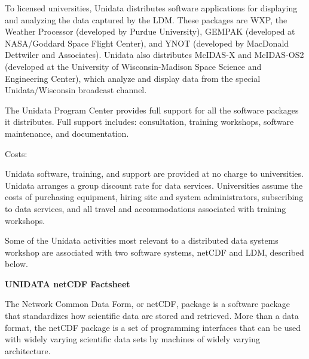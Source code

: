 	To licensed universities, Unidata distributes software applications 
for displaying and analyzing the data captured by the LDM.  These packages 
are WXP, the Weather Processor (developed by Purdue University), GEMPAK 
(developed at NASA/Goddard Space Flight Center), and YNOT (developed by 
MacDonald Dettwiler and Associates).  Unidata also distributes McIDAS-X 
and McIDAS-OS2 (developed at the University of Wisconsin-Madison Space 
Science and Engineering Center), which analyze and display data from the 
special Unidata/Wisconsin broadcast channel.

\bigskip
{}
\medskip

	The Unidata Program Center provides full support for all the 
software packages it distributes.  Full support includes:  consultation, 
training workshops, software maintenance, and documentation.

\noindent Costs:

	Unidata software, training, and support are provided at no charge to 
universities. Unidata arranges a group discount rate for data services.  
Universities assume the costs of purchasing equipment, hiring site and 
system administrators, subscribing to data services, and all travel and 
accommodations associated with training workshops.

	Some of the Unidata activities most relevant to a distributed data 
systems workshop are associated with two software systems, netCDF and 
LDM, described below.

\large
\begin{description}
\item{\bf *} {\bf UNIDATA netCDF Factsheet}
\end{description}
\normalsize

\medskip

	The Network Common Data Form, or netCDF, package is a software 
package that standardizes how scientific data are stored and retrieved. 
More than a data format, the netCDF package is a set of programming 
interfaces that can be used with widely varying scientific data sets by 
machines of widely varying architecture.


